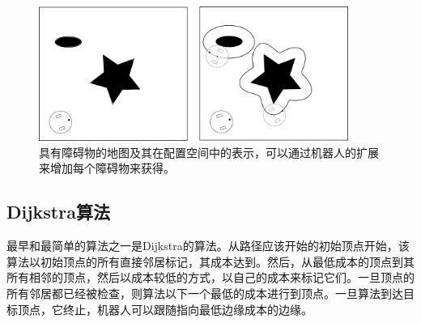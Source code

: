 \begin{figure}[!htb]
\centering
\includegraphics[width=0.9\textwidth]{figs/configurationspace}
\caption{具有障碍物的地图及其在配置空间中的表示，可以通过机器人的扩展来增加每个障碍物来获得。 \label{fig:cspace}}
\end{figure}


\subsection{Dijkstra算法}

最早和最简单的算法之一是Dijkstra的算法\cite{dijkstra1959note}。从路径应该开始的初始顶点开始，该算法以初始顶点的所有直接邻居标记，其成本达到。然后，从最低成本的顶点到其所有相邻的顶点，然后以成本较低的方式，以自己的成本来标记它们。一旦顶点的所有邻居都已经被检查，则算法以下一个最低的成本进行到顶点。一旦算法到达目标顶点，它终止，机器人可以跟随指向最低边缘成本的边缘。

